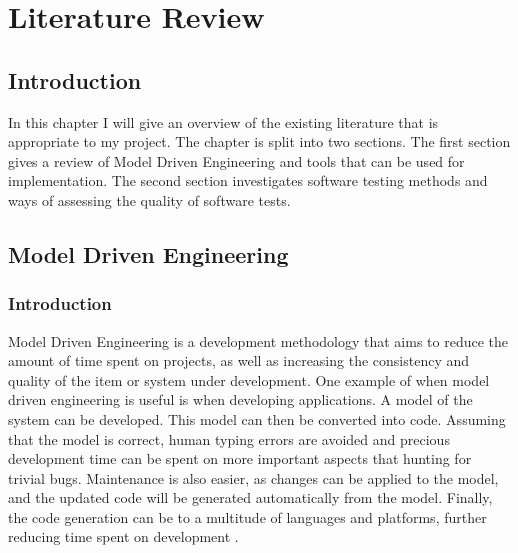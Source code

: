 \chapter{Literature Review}

\section{Introduction}
In this chapter I will give an overview of the existing literature that is appropriate to my project. The chapter is split into two sections. The first section gives a review of Model Driven Engineering and tools that can be used for implementation. The second section investigates software testing methods and ways of assessing the quality of software tests.

\section{Model Driven Engineering}

\subsection{Introduction}
Model Driven Engineering is a development methodology that aims to reduce the amount of time spent on projects, as well as increasing the consistency and quality of the item or system under development. One example of when model driven engineering is useful is when developing applications. A model of the system can be developed. This model can then be converted into code. Assuming that the model is correct, human typing errors are avoided and precious development time can be spent on more important aspects that hunting for trivial bugs. Maintenance is also easier, as changes can be applied to the model, and the updated code will be generated automatically from the model. Finally, the code generation can be to a multitude of languages and platforms, further reducing time spent on development \cite{mdseLano}.


